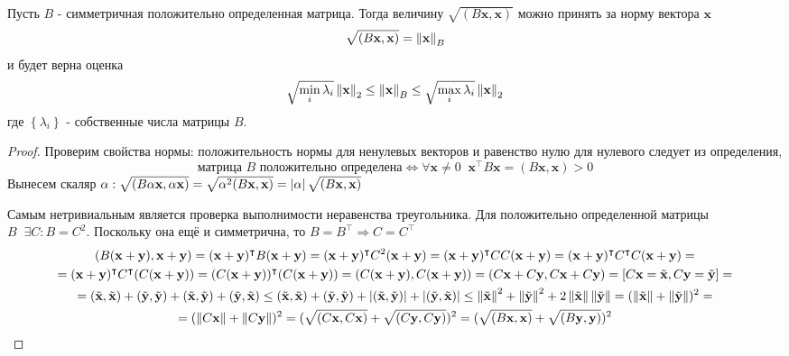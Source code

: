 \begin{theorem}
  Пусть $B$ - симметричная положительно определенная матрица. Тогда величину $\sqrt{(B \mathbf{x}, \mathbf{x})}$ можно принять за норму вектора $\mathbf{x}$
  $$
    \sqrt{(B \mathbf{x}, \mathbf{x})} = \left\lVert\mathbf{\mathbf{x}}\right\rVert_{B}
  $$
  и будет верна оценка
  $$
    \sqrt{\min_i \lambda_i} \left\lVert\mathbf{x}\right\rVert_{2} \le \left\lVert\mathbf{\mathbf{x}}\right\rVert_{B} \le \sqrt{\max_i \lambda_i} \left\lVert\mathbf{x}\right\rVert_{2}
  $$
  где $\left\{\lambda_i\right\}$ - собственные числа матрицы $B$.

  \begin{proof}
    Проверим свойства нормы:
    положительность нормы для ненулевых векторов и равенство нулю для нулевого следует из определения,
    $$
      \text{матрица } B \text{ положительно определена} \Leftrightarrow \forall \mathbf{x} \neq 0 \;\; \mathbf{x}^\intercal B \mathbf{x} = (B\mathbf{x}, \mathbf{x}) > 0
    $$
    Вынесем скаляр $\alpha : \sqrt{(B\alpha\mathbf{x}, \alpha\mathbf{x})} = \sqrt{\alpha^2(B\mathbf{x}, \mathbf{x})} = \left\lvert\alpha\right\rvert\sqrt{(B\mathbf{x}, \mathbf{x})} $

    Самым нетривиальным является проверка выполнимости неравенства треугольника. Для положительно определенной матрицы $B \;\; \exists C : B = C^2$. Поскольку она ещё и симметрична, то $B = B^\intercal \Rightarrow C = C^\intercal$
    \begin{multline*}
      (B(\mathbf{x}+\mathbf{y}), \mathbf{x}+\mathbf{y}) =
      (\mathbf{x} + \mathbf{y})^\intercal B (\mathbf{x} + \mathbf{y}) =
      (\mathbf{x} + \mathbf{y})^\intercal C^2 (\mathbf{x} + \mathbf{y}) =
      (\mathbf{x} + \mathbf{y})^\intercal C C (\mathbf{x} + \mathbf{y}) =
      (\mathbf{x} + \mathbf{y})^\intercal C^\intercal C (\mathbf{x} + \mathbf{y}) = \\
      = (\mathbf{x} + \mathbf{y})^\intercal C^\intercal (C (\mathbf{x} + \mathbf{y})) =
      (C(\mathbf{x} + \mathbf{y}))^\intercal (C (\mathbf{x} + \mathbf{y})) =
      (C(\mathbf{x} + \mathbf{y}), C(\mathbf{x} + \mathbf{y})) =
      (C\mathbf{x} + C\mathbf{y}, C\mathbf{x} + C\mathbf{y}) = \left[C\mathbf{x} = \tilde{\mathbf{x}}, C\mathbf{y} = \tilde{\mathbf{y}}\right] = \\
      = (\tilde{\mathbf{x}}, \tilde{\mathbf{x}}) + (\tilde{\mathbf{y}}, \tilde{\mathbf{y}}) + (\tilde{\mathbf{x}}, \tilde{\mathbf{y}}) + (\tilde{\mathbf{y}}, \tilde{\mathbf{x}}) \le
      (\tilde{\mathbf{x}}, \tilde{\mathbf{x}}) + (\tilde{\mathbf{y}}, \tilde{\mathbf{y}}) + \left\lvert(\tilde{\mathbf{x}}, \tilde{\mathbf{y}})\right\rvert + \left\lvert(\tilde{\mathbf{y}}, \tilde{\mathbf{x}})\right\rvert \le
      \left\lVert\tilde{\mathbf{x}}\right\rVert^2 + \left\lVert\tilde{\mathbf{y}}\right\rVert^2 + 2\left\lVert\tilde{\mathbf{x}}\right\rVert\left\lVert\tilde{\mathbf{y}}\right\rVert =
      (\left\lVert\tilde{\mathbf{x}}\right\rVert + \left\lVert\tilde{\mathbf{y}}\right\rVert)^2 = \\
      = (\left\lVert C\mathbf{x}\right\rVert + \left\lVert C\mathbf{y}\right\rVert)^2 =
      (\sqrt{(C\mathbf{x}, C\mathbf{x})} + \sqrt{(C\mathbf{y}, C\mathbf{y})})^2 =
      (\sqrt{(B\mathbf{x}, \mathbf{x})} + \sqrt{(B\mathbf{y}, \mathbf{y})})^2
    \end{multline*}


\end{proof}
\end{theorem}
